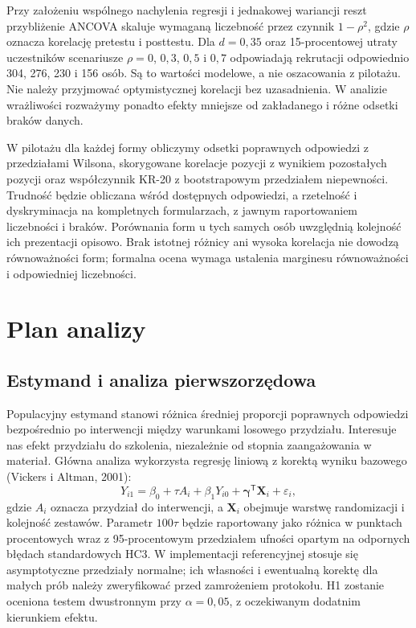 \documentclass[11pt,a4paper]{article}
\begin{document}
Przy założeniu wspólnego nachylenia regresji i jednakowej wariancji reszt przybliżenie ANCOVA skaluje wymaganą liczebność przez czynnik \(1-\rho^2\), gdzie \(\rho\) oznacza korelację pretestu i posttestu. Dla \(d=0{,}35\) oraz 15-procentowej utraty uczestników scenariusze \(\rho=0\), \(0{,}3\), \(0{,}5\) i \(0{,}7\) odpowiadają rekrutacji odpowiednio 304, 276, 230 i 156 osób. Są to wartości modelowe, a nie oszacowania z pilotażu. Nie należy przyjmować optymistycznej korelacji bez uzasadnienia. W analizie wrażliwości rozważymy ponadto efekty mniejsze od zakładanego i różne odsetki braków danych.

W pilotażu dla każdej formy obliczymy odsetki poprawnych odpowiedzi z przedziałami Wilsona, skorygowane korelacje pozycji z wynikiem pozostałych pozycji oraz współczynnik KR-20 z bootstrapowym przedziałem niepewności. Trudność będzie obliczana wśród dostępnych odpowiedzi, a rzetelność i dyskryminacja na kompletnych formularzach, z jawnym raportowaniem liczebności i braków. Porównania form u tych samych osób uwzględnią kolejność ich prezentacji opisowo. Brak istotnej różnicy ani wysoka korelacja nie dowodzą równoważności form; formalna ocena wymaga ustalenia marginesu równoważności i odpowiedniej liczebności.

\section{Plan analizy}
\subsection{Estymand i analiza pierwszorzędowa}
Populacyjny estymand stanowi różnica średniej proporcji poprawnych odpowiedzi bezpośrednio po interwencji między warunkami losowego przydziału. Interesuje nas efekt przydziału do szkolenia, niezależnie od stopnia zaangażowania w materiał. Główna analiza wykorzysta regresję liniową z korektą wyniku bazowego (Vickers i Altman, 2001):
\[
Y_{i1}=\beta_0+\tau A_i+\beta_1Y_{i0}
+\boldsymbol{\gamma}^{\mathsf T}\mathbf{X}_i+\varepsilon_i,
\]
gdzie \(A_i\) oznacza przydział do interwencji, a \(\mathbf X_i\) obejmuje warstwę randomizacji i kolejność zestawów. Parametr \(100\tau\) będzie raportowany jako różnica w punktach procentowych wraz z 95-procentowym przedziałem ufności opartym na odpornych błędach standardowych HC3. W implementacji referencyjnej stosuje się asymptotyczne przedziały normalne; ich własności i ewentualną korektę dla małych prób należy zweryfikować przed zamrożeniem protokołu. H1 zostanie oceniona testem dwustronnym przy \(\alpha=0{,}05\), z oczekiwanym dodatnim kierunkiem efektu.
\end{document}
